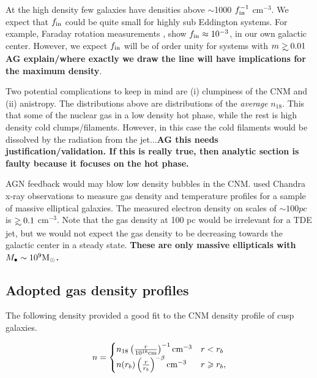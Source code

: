 \documentclass[usenatbib,fleqn]{mnras}
\newcommand\gsim{\mathrel{\rlap{\lower4pt\hbox{\hskip1pt$\sim$}}
    \raise1pt\hbox{$>$}}}
\newcommand{\Mbh}[1][]{M_{\bullet#1}}
\newcommand{\Msun}{{\rm M_\odot}}
\begin{document}
At the high density few galaxies have densities above $\sim$1000
$f_{\rm in}^{-1}$ cm$^{-3}$.  We expect that $f_{\rm in}$ could be
quite small for highly sub Eddington systems. For example, Faraday
rotation measurements \citet{Quataert1999}, show $f_{\rm in}\approx
10^{-3}$, in our own galactic center. However,  we expect $f_{\rm in}$
will be of order unity for systems with $m\gsim 0.01$ {\bf AG
  explain/where exactly we draw the line will have implications for
  the maximum density}. 

Two potential complications to keep in mind are (i) clumpiness of the
CNM and (ii) anistropy. The distributions above are
distributions of the {\it average} $n_{18}$. This that some of the
nuclear gas in a low density hot phase, while the rest is high density
cold clumps/filaments. However, in this case the cold filaments would
be dissolved by the radiation from the jet...{\bf AG this needs
  justification/validation. If this is really true, then analytic
  section is faulty because it focuses on the hot phase.}




AGN feedback would may blow low density bubbles in the
CNM. \citet{Russell+2013} used Chandra x-ray observations to measure gas
density and temperature profiles for a sample of massive elliptical
galaxies. The measured electron density on scales of $\sim 100
pc$ is $\gsim 0.1$ cm$^{-3}$. Note that the gas density at 100 pc
would be irrelevant for a TDE jet, but we would not expect the gas
density to be decreasing towards the galactic center in a steady
state. {\bf These are only massive ellipticals with $\Mbh\sim 10^{9} \Msun$.}

\subsection{Adopted gas density profiles}
 The following density provided a good fit to the CNM density profile
 of cusp galaxies.

\begin{align}
n=
\begin{cases}
  n_{18} \left(\frac{r}{10^{18} {\rm cm}}\right)^{-1} {\rm cm^{-3}} & r<r_b \\
  n(r_b) \left(\frac{r}{r_b}\right)^{-\beta} {\rm cm^{-3}} & r\geq
  r_b,\\
  \label{eq:profile}
\end{cases}
\end{align}
\end{document}
